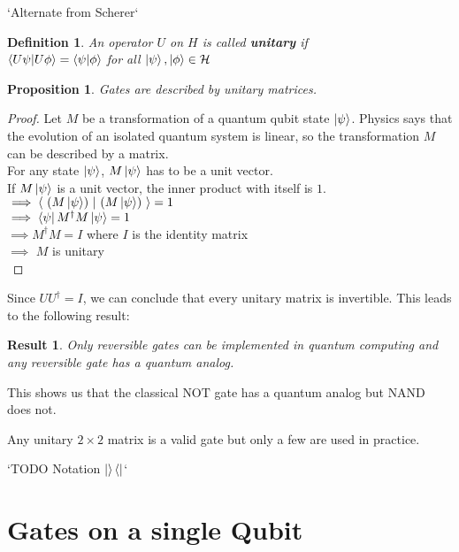 \documentclass[12pt,twoside]{report}
\newtheorem{defn}[subsection]{Definition}
\newtheorem{result}[subsection]{Result}
\newtheorem{prop}[subsection]{Proposition}
\begin{document}
`Alternate from Scherer`
\begin{defn}
    An operator $U$ on $H$ is called \textbf{unitary} if \\
    $\braket{U \psi | U \phi } = \braket{\psi | \phi }$ for all $\ket{\psi}, \ket{\phi} \in \mathcal{H}$
\end{defn}

\begin{prop}
Gates are described by unitary matrices.
\end{prop}
\begin{proof}
    Let $M$ be a transformation of a quantum qubit state $\ket{\psi}$. Physics says that the evolution of an isolated quantum system is linear, so the transformation $M$ can be described by a matrix. \\

    For any state $\ket{\psi}$, $M \ket{\psi}$ has to be a unit vector. \\
    If $M \ket{\psi}$ is a unit vector, the inner product with itself is $1$.\\
    $\implies \braket{ \ (M\ket{\psi}) \ |\  (M \ket{\psi}) \ } = 1$\\
    $\implies \bra{\psi} M^\dagger M \ket{\psi} = 1$ \\
    $\implies M^\dagger M = I$ where $I$ is the identity matrix\\
    $\implies$ $M$ is unitary\\
\end{proof}


Since $U U^\dagger = I$, we can conclude that every unitary matrix is invertible.
This leads to the following result:
\begin{result}
    Only reversible gates can be implemented in quantum computing and any reversible gate has a quantum analog.
\end{result}

This shows us that the classical $\text{NOT}$ gate has a quantum analog but $\text{NAND}$ does not.

Any unitary $2 \times 2$ matrix is a valid gate but only a few are used in practice.


`TODO Notation $\ket{}\bra{}$`
\section{Gates on a single Qubit}
\end{document}
